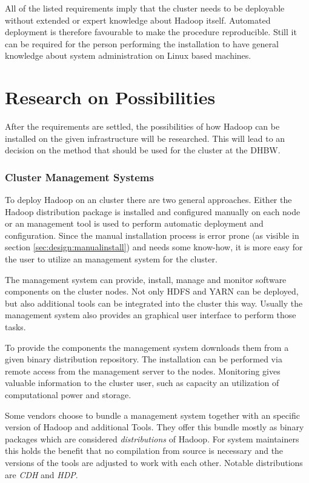 All of the listed requirements imply that the cluster needs to be deployable without extended or expert knowledge about Hadoop itself.
Automated deployment is therefore favourable to make the procedure reproducible. 
Still it can be required for the person performing the installation to have general knowledge about system administration on Linux based machines.


\section{Research on Possibilities}

After the requirements are settled,
the possibilities of how Hadoop can be installed 
on the given infrastructure will be researched.
This will lead to an decision on the method that should be used for the cluster at the \ac{DHBW}.

\subsubsection{Cluster Management Systems}

To deploy Hadoop on an cluster there are two general approaches. Either the Hadoop distribution package is installed and configured manually on each node or an management tool is used to perform automatic deployment and configuration. 
Since the manual installation process is error prone (as visible in section \ref{sec:design:manualinstall}) and needs some know-how,
it is  more easy for the user to utilize an management system for the cluster.

The management system can provide, install, manage and monitor software components on the cluster nodes.
Not only \ac{HDFS} and \ac{YARN} can be deployed,
but also additional tools can be integrated into the cluster this way.
Usually the management system also provides an graphical user interface to perform those tasks.

To provide the components the management system downloads them from a given binary distribution repository. The installation can be performed via remote access from the management server to the nodes. Monitoring gives valuable information to the cluster user, such as capacity an utilization of computational power and storage.

Some vendors choose to bundle a management system 
together with an specific version of Hadoop and additional Tools. They offer this bundle mostly as binary packages which are considered \emph{distributions} of Hadoop.
For system maintainers this holds the benefit that no compilation from source is necessary and the versions of the tools are adjusted to work with each other. 
Notable distributions are \emph{\acf{CDH}} and \emph{\acf{HDP}}. 

